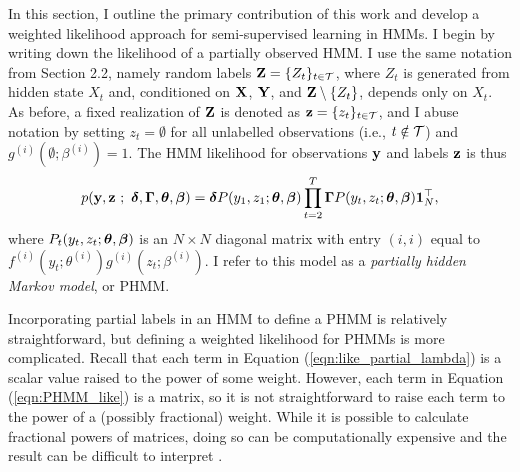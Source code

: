 
In this section, I outline the primary contribution of this work and develop a weighted likelihood approach for semi-supervised learning in HMMs. %
I begin by writing down the likelihood of a partially observed HMM. I use the same notation from Section 2.2, namely random labels $\mathbf{Z} = \{Z_t\}_{t \in \mathcal{T}}$, where $Z_t$ is generated from hidden state $X_t$ and, conditioned on $\mathbf{X}$, $\mathbf{Y}$, and $\mathbf{Z} \setminus \{Z_t\}$, depends only on $X_t$. As before, a fixed realization of $\mathbf{Z}$ is denoted as $\mathbf{z} = \{z_t\}_{t \in \mathcal{T}}$, and I abuse notation by setting $z_t = \emptyset$ for all unlabelled observations (i.e., $t \notin \mathcal{T}$) and $g^{(i)}(\emptyset ; \beta^{(i)}) = 1$. The HMM likelihood for observations $\mathbf{y}$ and labels $\mathbf{z}$ is thus
%
\begin{equation}
    p(\mathbf{y},\mathbf{z} ~;~ \boldsymbol{\delta}, \boldsymbol{\Gamma}, \boldsymbol{\theta},\boldsymbol{\beta}) = \boldsymbol{\delta} P(y_1,z_1;\boldsymbol{\theta},\boldsymbol{\beta}) \prod_{t=2}^T \boldsymbol{\Gamma} P(y_t,z_t;\boldsymbol{\theta},\boldsymbol{\beta}) \mathbf{1}^\top_N, \label{eqn:PHMM_like}
\end{equation}
%
where $P_t(y_t,z_t;\boldsymbol{\theta},\boldsymbol{\beta})$ is an $N \times N$ diagonal matrix with entry $(i,i)$ equal to $f^{(i)}(y_t; \theta^{(i)}) g^{(i)}(z_t; \beta^{(i)})$. I refer to this model as a \textit{partially hidden Markov model}, or PHMM.

Incorporating partial labels in an HMM to define a PHMM is relatively straightforward, but defining a weighted likelihood for PHMMs is more complicated. Recall that each term in Equation (\ref{eqn:like_partial_lambda}) is a scalar value raised to the power of some weight. However, each term in Equation (\ref{eqn:PHMM_like}) is a matrix, so it is not straightforward to raise each term to the power of a (possibly fractional) weight. While it is possible to calculate fractional powers of matrices, doing so can be computationally expensive and the result can be difficult to interpret \citep{Higham:2011}. 

